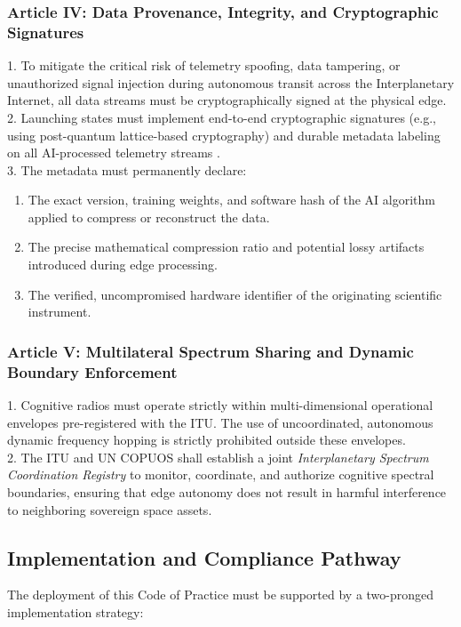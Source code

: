 \documentclass[final,5p,times,twocolumn]{elsarticle}
\begin{document}
\subsubsection*{Article IV: Data Provenance, Integrity, and Cryptographic Signatures}
1. To mitigate the critical risk of telemetry spoofing, data tampering, or unauthorized signal injection during autonomous transit across the Interplanetary Internet, all data streams must be cryptographically signed at the physical edge. \\
2. Launching states must implement end-to-end cryptographic signatures (e.g., using post-quantum lattice-based cryptography) and durable metadata labeling on all AI-processed telemetry streams \citep{smith2024cybersecurity}. \\
3. The metadata must permanently declare:
\begin{enumerate}
\item The exact version, training weights, and software hash of the AI algorithm applied to compress or reconstruct the data.
\item The precise mathematical compression ratio and potential lossy artifacts introduced during edge processing.
\item The verified, uncompromised hardware identifier of the originating scientific instrument.
\end{enumerate}

\subsubsection*{Article V: Multilateral Spectrum Sharing and Dynamic Boundary Enforcement}
1. Cognitive radios must operate strictly within multi-dimensional operational envelopes pre-registered with the ITU. The use of uncoordinated, autonomous dynamic frequency hopping is strictly prohibited outside these envelopes. \\
2. The ITU and UN COPUOS shall establish a joint \textit{Interplanetary Spectrum Coordination Registry} to monitor, coordinate, and authorize cognitive spectral boundaries, ensuring that edge autonomy does not result in harmful interference to neighboring sovereign space assets.

\subsection{Implementation and Compliance Pathway}

The deployment of this Code of Practice must be supported by a two-pronged implementation strategy:
\end{document}
